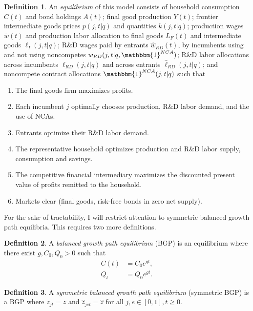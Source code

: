 \documentclass[ecta,nameyear,final]{econsocart}
\theoremstyle{definition}
\newtheorem{definition}{Definition}
\begin{document}
\theoremstyle{definition}
\begin{definition}
	An \emph{equilibrium} of this model consists of household consumption $C(t)$ and bond holdings $A(t)$; final good production $Y(t)$; frontier intermediate goods prices $p(j,t|q)$ and quantities $k(j,t|q)$; production wages $\bar{w}(t)$ and production labor allocation to final goods $L_{F}(t)$ and intermediate goods $\ell_I(j,t|q)$; R\&D wages paid by entrants $\hat{w}_{RD}(t)$, by incumbents using and not using noncompetes $w_{RD}(j,t|q,\mathbbm{1}^{NCA})$; R\&D labor allocations across incumbents $\ell_{RD}(j,t|q)$ and across entrants $\hat{\ell}_{RD}(j,t|q)$; and noncompete contract allocations $\mathbbm{1}^{NCA}(j,t|q)$ such that 
	\begin{enumerate}
		\item The final goods firm maximizes profits.
		\item Each incumbent $j$ optimally chooses production, R\&D labor demand, and the use of NCAs.
		\item Entrants optimize their R\&D labor demand.
		\item The representative household optimizes production and R\&D labor supply, consumption and savings.
		\item The competitive financial intermediary maximizes the discounted present value of profits remitted to the household.
		\item Markets clear (final goods, risk-free bonds in zero net supply).
	\end{enumerate}
\end{definition}

For the sake of tractability, I will restrict attention to symmetric balanced growth path equilibria. This requires two more definitions.

\theoremstyle{definition}
\begin{definition}
	A \emph{balanced growth path equilibrium} (BGP) is an equilibrium where there exist $g, C_0, Q_0 > 0$ such that
	\begin{align*}
		C(t) &= C_0 e^{gt}, \\
		Q_t &= Q_0 e^{gt}.
	\end{align*}
\end{definition}

\theoremstyle{definition}
\begin{definition}
	A \emph{symmetric balanced growth path equilibrium} (symmetric BGP) is a BGP where $z_{jt} = z$ and $\hat{z}_{jet} = \hat{z}$ for all $j,e \in [0,1], t \ge 0$. 
\end{definition}
\end{document}
